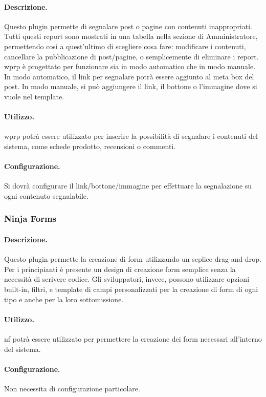 \paragraph{Descrizione.} Questo plugin permette di segnalare post o pagine con contenuti inappropriati. Tutti questi report sono mostrati in una tabella nella sezione di Amministratore, permettendo così a quest'ultimo di scegliere cosa fare: modificare i contenuti, cancellare la pubblicazione di post/pagine, o semplicemente di eliminare i report. \gls{wprp} è progettato per funzionare sia in modo automatico che in modo manuale. In modo automatico, il link per segnalare potrà essere aggiunto al meta box del post. In modo manuale, si può aggiungere il link, il bottone o l'immagine dove si vuole nel template.
\paragraph{Utilizzo.} \gls{wprp} potrà essere utilizzato per inserire la possibilità di segnalare i contenuti del sistema, come schede prodotto, recensioni o commenti.
\paragraph{Configurazione.} Si dovrà configurare il link/bottone/immagine per effettuare la segnalazione su ogni contenuto segnalabile.

\subsubsection{Ninja Forms}
\paragraph{Descrizione.} Questo plugin permette la creazione di form utilizzando un seplice drag-and-drop. Per i principianti è presente un design di creazione form semplice senza la necessità di scrivere codice. Gli sviluppatori, invece, possono utilizzare opzioni built-in, filtri, e template di campi personalizzati per la creazione di form di ogni tipo e anche per la loro sottomissione.
\paragraph{Utilizzo.} \gls{nf} potrà essere utilizzato per permettere la creazione dei form necessari all'interno del sistema.
\paragraph{Configurazione.} Non necessita di configurazione particolare.

